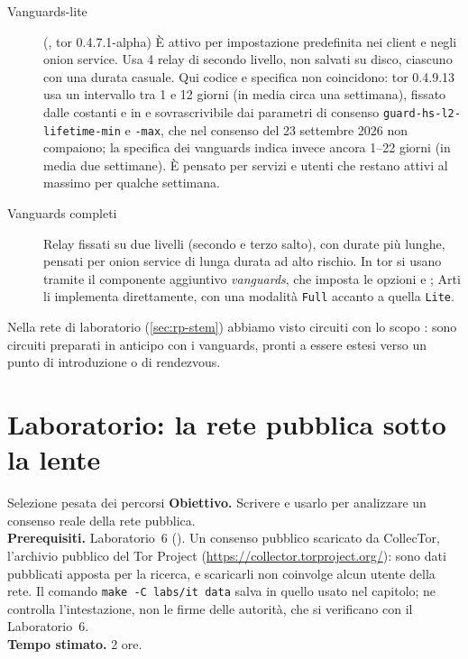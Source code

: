 \begin{description}
  \item[Vanguards-lite] (, tor 0.4.7.1-alpha) È attivo per impostazione predefinita nei client e negli onion service. Usa 4 relay di secondo livello, non salvati su disco, ciascuno con una durata casuale. Qui codice e specifica non coincidono: tor 0.4.9.13 usa un intervallo tra 1 e 12 giorni (in media circa una settimana), fissato dalle costanti  e  in  e sovrascrivibile dai parametri di consenso \texttt{guard-hs-l2-lifetime-min} e \texttt{-max}, che nel consenso del 23 settembre 2026 non compaiono; la specifica dei vanguards indica invece ancora 1--22 giorni (in media due settimane). È pensato per servizi e utenti che restano attivi al massimo per qualche settimana.
  \item[Vanguards completi] Relay fissati su due livelli (secondo e terzo salto), con durate più lunghe, pensati per onion service di lunga durata ad alto rischio. In tor si usano tramite il componente aggiuntivo \emph{vanguards}, che imposta le opzioni  e ; Arti li implementa direttamente, con una modalità \texttt{Full} accanto a quella \texttt{Lite}.
\end{description}
Nella rete di laboratorio (\cref{sec:rp-stem}) abbiamo visto circuiti con lo scopo : sono circuiti preparati in anticipo con i vanguards, pronti a essere estesi verso un punto di introduzione o di rendezvous.

\section{Laboratorio: la rete pubblica sotto la lente}\label{sec:lab-percorso}

\begin{laboratorio}[7]{Selezione pesata dei percorsi}
\textbf{Obiettivo.} Scrivere  e usarlo per analizzare un consenso reale della rete pubblica.\\
\textbf{Prerequisiti.} Laboratorio~6 (). Un consenso pubblico scaricato da CollecTor, l'archivio pubblico del Tor Project (\url{https://collector.torproject.org/}): sono dati pubblicati apposta per la ricerca, e scaricarli non coinvolge alcun utente della rete. Il comando \texttt{make -C labs/it data} salva in  quello usato nel capitolo; ne controlla l'intestazione, non le firme delle autorità, che si verificano con il Laboratorio~6.\\
\textbf{Tempo stimato.} 2 ore.
\end{laboratorio}

